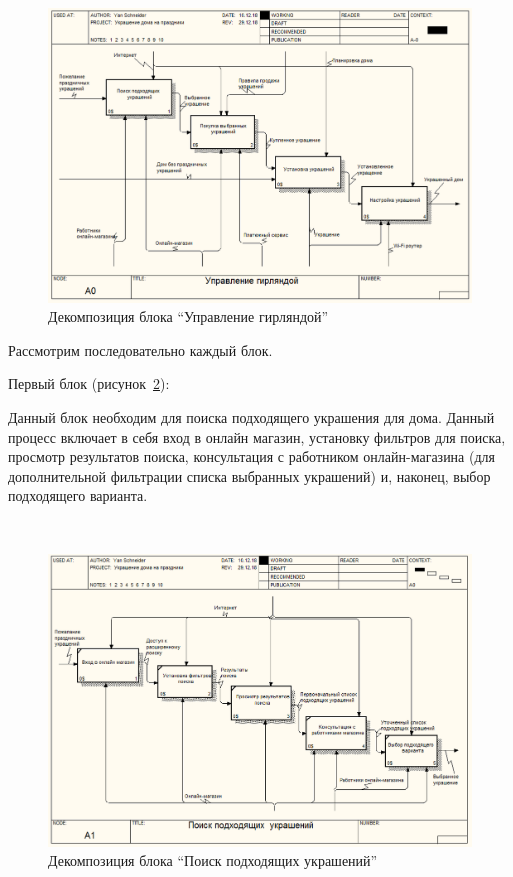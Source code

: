 ~
\begin{figure}[H]
\centering
	\includegraphics[scale=0.45]{figures/functionalModel/a0_decoration.jpg}
	\caption{Декомпозиция блока ``Управление гирляндой''}
	\label{fig:develop:functionalModel:a0_decoration}
\end{figure}

Рассмотрим последовательно каждый блок.

Первый блок (рисунок~\ref{fig:develop:functionalModel:a1_search}):

Данный блок необходим для поиска подходящего украшения для дома. Данный процесс включает в себя вход в онлайн магазин, установку фильтров для поиска, просмотр результатов поиска, консультация с работником онлайн-магазина (для дополнительной фильтрации списка выбранных украшений) и, наконец, выбор подходящего варианта.

 ~
\begin{figure}[H]
\centering
	\includegraphics[scale=0.45]{figures/functionalModel/a1_search.jpg}
	\caption{Декомпозиция блока ``Поиск подходящих украшений''}
	\label{fig:develop:functionalModel:a1_search}
\end{figure}

